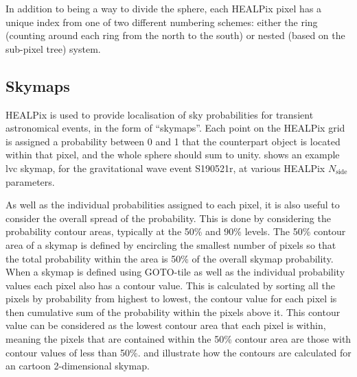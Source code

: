 \begin{colsection}
\begin{colsection}
In addition to being a way to divide the sphere, each HEALPix pixel has a unique index from one of two different numbering schemes: either the ring (counting around each ring from the north to the south) or nested (based on the sub-pixel tree) system.

\end{colsection}


\subsection{Skymaps}
\label{sec:skymaps}
\begin{colsection}

HEALPix is used to provide localisation of sky probabilities for transient astronomical events, in the form of ``skymaps''. Each point on the HEALPix grid is assigned a probability between 0 and 1 that the counterpart object is located within that pixel, and the whole sphere should sum to unity.  shows an example \gls{lvc} skymap, for the gravitational wave event S190521r, at various HEALPix $N_\text{side}$ parameters.

As well as the individual probabilities assigned to each pixel, it is also useful to consider the overall spread of the probability. This is done by considering the probability contour areas, typically at the 50\% and 90\% levels. The 50\% contour area of a skymap is defined by encircling the smallest number of pixels so that the total probability within the area is 50\% of the overall skymap probability. When a skymap is defined using GOTO-tile as well as the individual probability values each pixel also has a contour value. This is calculated by sorting all the pixels by probability from highest to lowest, the contour value for each pixel is then cumulative sum of the probability within the pixels above it. This contour value can be considered as the lowest contour area that each pixel is within, meaning the pixels that are contained within the 50\% contour area are those with contour values of less than 50\%.  and  illustrate how the contours are calculated for an cartoon 2-dimensional skymap.


\end{colsection}
\end{colsection}
